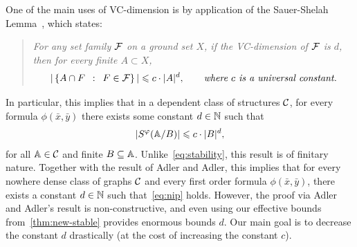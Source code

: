  One of the main uses of VC-dimension is by application of the
Sauer-Shelah Lemma~\cite{chervonenkis1971theory,sauer1972density, shelah1972combinatorial}, which states:
\begin{quote}
  \itshape
  For any set family $\FFF$ on a ground set $X$, if the VC-dimension of $\FFF$ is $d$,
  then for every finite $A\subset X$,
  \begin{align}\label{eq:sauer-shelah}
|\setof{A\cap F}{F\in {\cal F}}|\le c\cdot |A|^d,  
\qquad\textit{where $c$ is a universal constant.}
  \end{align} 
\end{quote}
In particular, this implies that 
in a dependent class of structures $\cal C$, 
for every formula $\phi(\bar x,\bar y)$
there exists some constant $d\in \N$
such that
\begin{align}\label{eq:nip}
|S^\phi(\str A/B)|\le c\cdot |B|^d,	
\end{align}
for all $\str A\in\cal C$ and finite $B\subset \str A$.
Unlike~\eqref{eq:stability}, this result 
is of finitary nature. 
Together with the result of Adler and Adler, this implies that for every nowhere dense class of graphs $\cal C$
and every first order formula $\phi(\bar x,\bar y)$,
there exists a constant $d\in\N$ such that~\eqref{eq:nip} holds. However, the proof via Adler and Adler's result is non-constructive, and even using our effective bounds from~\cref{thm:new-stable} provides enormous bounds $d$.
Our main goal is to decrease the constant $d$ drastically (at the cost of increasing the constant $c$).

